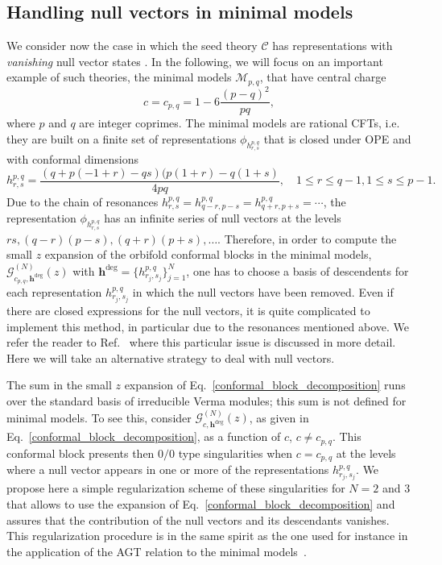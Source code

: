 \documentclass[a4paper,11pt]{article}
\begin{document}
\subsection{Handling null vectors in minimal models}
\label{null_vec1}
We consider now the case in which the seed theory $\mathcal{C}$ has representations with {\it vanishing} null vector states \cite{BPZ}. 
In the following, we will focus on an important example of such theories, the minimal models $\mathcal{M}_{p,q}$, that have central charge
\begin{equation}
c=c_{p,q}= 1 -6\frac{ (p-q)^2}{p q},
\end{equation}
where $p$ and $q$ are integer coprimes. The minimal models are rational CFTs, i.e. they are built on a finite set of representations $\phi_{h^{p,q}_{r,s}}$ that is closed under OPE and with conformal dimensions
 \begin{equation}
 h^{p,q}_{r,s}=\frac{(q + p (-1 + r) - q s) (p (1 + r) - q (1 + s)}{4 p q}, \quad 1\leq r\leq q-1,  1\leq s\leq p-1.
 \end{equation}
Due to the chain of resonances $h_{r,s}^{p, q}=h_{q-r,p-s}^{p, q}=h_{q+r,p+s}^{p, q}=\cdots$, the representation $\phi_{h^{p,q}_{r,s}}$ has an infinite series of null vectors at the levels $r s, (q-r)(p-s),(q+r)(p+s), \dots$. Therefore, in order to compute the small $z$ expansion of the orbifold conformal blocks in the minimal models, $\mathcal{G}_{c_{p,q}, \boldsymbol{h}^{\text{deg}}}^{(N)}(z)$ with $\boldsymbol{h}^{\text{deg}}=\{h_{r_j, s_j}^{p, q}\}_{j=1}^N$, one has to choose a basis of descendents for each representation $h_{r_j, s_j}^{p, q}$ in which the null vectors have been removed. Even if there are closed expressions for the null vectors, it is quite complicated to implement this method, in particular due to the resonances mentioned above. We refer the reader to Ref.~\cite{Javerzat} where this particular issue is discussed in more detail. Here we will take an alternative strategy to deal with null vectors.
 
The sum in the small $z$ expansion of Eq.~\eqref{conformal_block_decomposition} runs over the standard basis of irreducible Verma modules; this sum  is not defined for minimal models. To see this, consider $\mathcal{G}_{c, \boldsymbol{h}^{\text{deg}}}^{(N)}(z)$, as given in Eq.~\eqref{conformal_block_decomposition}, as a function of $c$, $c\neq c_{p,q}$.  This conformal block presents then $0/0$ type singularities when $c=c_{p, q}$ at the levels where a null vector appears in one or more of the representations $h_{r_j, s_j}^{p, q}$. We propose here a simple regularization scheme of these singularities for $N=2$ and $3$ that allows to use the expansion of Eq.~\eqref{conformal_block_decomposition} and assures that the contribution of the null vectors and its descendants vanishes. This regularization procedure is in the same spirit as the one used for instance in the application of the AGT relation to the minimal models~\cite{Alkalaev}.
\end{document}

